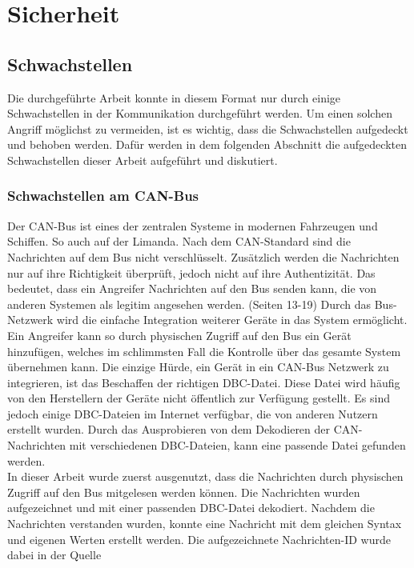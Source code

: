 \chapter{Sicherheit}

\section{Schwachstellen}
Die durchgeführte Arbeit konnte in diesem Format nur durch einige Schwachstellen in der Kommunikation durchgeführt werden.
Um einen solchen Angriff möglichst zu vermeiden, ist es wichtig, dass die Schwachstellen aufgedeckt und behoben werden.
Dafür werden in dem folgenden Abschnitt die aufgedeckten Schwachstellen dieser Arbeit aufgeführt und diskutiert.

\subsection{Schwachstellen am CAN-Bus}
Der CAN-Bus ist eines der zentralen Systeme in modernen Fahrzeugen und Schiffen. So auch auf der Limanda.
Nach dem CAN-Standard sind die Nachrichten auf dem Bus nicht verschlüsselt. Zusätzlich werden die Nachrichten nur 
auf ihre Richtigkeit überprüft, jedoch nicht auf ihre Authentizität. Das bedeutet, dass ein Angreifer Nachrichten auf den Bus
senden kann, die von anderen Systemen als legitim angesehen werden.\cite{Voss2008} (Seiten 13-19) Durch das Bus-Netzwerk wird die einfache Integration weiterer
Geräte in das System ermöglicht. Ein Angreifer kann so durch physischen Zugriff auf den Bus ein Gerät hinzufügen, welches im schlimmsten Fall
die Kontrolle über das gesamte System übernehmen kann. Die einzige Hürde, ein Gerät in ein CAN-Bus Netzwerk zu integrieren, ist das
Beschaffen der richtigen DBC-Datei. Diese Datei wird häufig von den Herstellern der Geräte nicht öffentlich zur Verfügung gestellt.
Es sind jedoch einige DBC-Dateien im Internet verfügbar, die von anderen Nutzern erstellt wurden. Durch das Ausprobieren von dem Dekodieren
der CAN-Nachrichten mit verschiedenen DBC-Dateien, kann eine passende Datei gefunden werden. \\
In dieser Arbeit wurde zuerst ausgenutzt, dass die Nachrichten durch physischen Zugriff auf den Bus mitgelesen werden können.
Die Nachrichten wurden aufgezeichnet und mit einer passenden DBC-Datei dekodiert. Nachdem die Nachrichten verstanden wurden, konnte
eine Nachricht mit dem gleichen Syntax und eigenen Werten erstellt werden. Die aufgezeichnete Nachrichten-ID wurde dabei in der Quelle 
